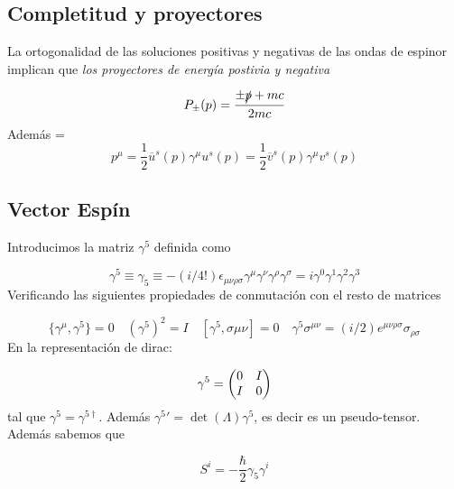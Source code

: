 \subsection{Completitud y proyectores}

La ortogonalidad de las soluciones positivas y negativas de las ondas de espinor implican que \textit{los proyectores de energía postivia y negativa} 

\begin{equation}
	P_\pm (p) = \frac{\pm \slashed{p} + mc}{2mc}
\end{equation}
Además 
=
\begin{equation}
	p^\mu = \frac{1}{2} \overline{u}^s(p)\gamma^\mu u^s(p)=
	 \frac{1}{2} \overline{v}^s(p)\gamma^\mu v^s(p)
\end{equation}

\subsection{Vector Espín}

Introducimos la matriz $\gamma^5$ definida como

\begin{equation}
	\gamma^5 \equiv \gamma_5 \equiv -(i/4!) \epsilon_{\mu \nu \rho \sigma} \gamma^\mu \gamma^\nu \gamma^\rho \gamma^\sigma = i \gamma^0 \gamma^1 \gamma^2 \gamma^3
\end{equation}
Verificando las siguientes propiedades de conmutación con el resto de matrices

\begin{equation}
	\{\gamma^\mu,\gamma^5\}=0\quad (\gamma^5)^2= I \quad [\gamma^5,\sigma{\mu\nu}]=0 \quad \gamma^5 \sigma^{\mu \nu} = (i/2)e^{\mu \nu \rho \sigma} \sigma_{\rho \sigma}
\end{equation}
En la representación de dirac:

\begin{equation}
	\gamma^5 = \mqty(0&I\\I&0)
\end{equation}
tal que $\gamma^5=\gamma^{5\dagger}$. Además $\gamma^5'=\det(\Lambda)\gamma^5$, es decir es un pseudo-tensor. Además sabemos que 

\begin{equation}
	S^i = - \frac{\hbar}{2} \gamma_5 \gamma^i
\end{equation}









